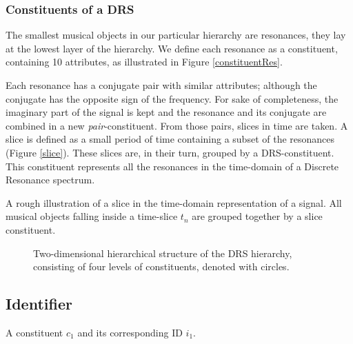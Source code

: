\subsubsection{Constituents of a DRS}
The smallest musical objects in our particular hierarchy are resonances, they lay at the lowest layer of the hierarchy. 
We define each resonance as a constituent, containing 10 attributes, as illustrated in Figure \ref{constituentRes}. 

Each resonance has a conjugate pair with similar attributes; although the conjugate has the opposite sign of the frequency. For sake of completeness, the imaginary part of the signal is kept and the resonance and its conjugate are combined in a new \textit{pair}-constituent. From those pairs, slices in time are taken. A slice is defined as a small period of time containing a subset of the resonances (Figure \ref{slice}). These slices are, in their turn, grouped by a DRS-constituent. This constituent represents all the resonances in the time-domain of a Discrete Resonance spectrum.

\begin{marginfigure}
\centering

\vspace{0.1cm}
\caption{A rough illustration of a slice in the time-domain representation of a signal. All musical objects falling inside a time-slice $t_n$ are grouped together by a slice constituent.}
\label{slice} \vspace{2cm}
\end{marginfigure}

\begin{figure}[h]
\centering

\vspace{0.1cm}
\caption{Two-dimensional hierarchical structure of the DRS hierarchy, consisting of four levels of constituents, denoted with circles.}
\label{drs} 
\end{figure}


\subsection{Identifier}

\begin{marginfigure}
\centering

\vspace{0.3cm}
\caption{A constituent $c_1$ and its corresponding ID $i_1$.}
\label{id} \vspace{2cm}
\end{marginfigure}

